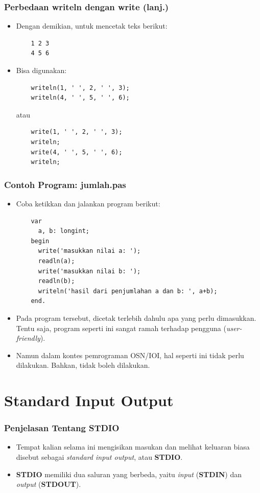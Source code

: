 \begin{frame}[fragile]
\frametitle{Perbedaan writeln dengan write (lanj.)}
\begin{itemize}
  \item Dengan demikian, untuk mencetak teks berikut:
  \begin{lstlisting}
    1 2 3
    4 5 6
  \end{lstlisting}
  \item Bisa digunakan:
  \begin{lstlisting}
    writeln(1, ' ', 2, ' ', 3);
    writeln(4, ' ', 5, ' ', 6);
  \end{lstlisting}
  atau
  \begin{lstlisting}
    write(1, ' ', 2, ' ', 3);
    writeln;
    write(4, ' ', 5, ' ', 6);
    writeln;
  \end{lstlisting}
\end{itemize}
\end{frame}

\begin{frame}[fragile]
\frametitle{Contoh Program: jumlah.pas}
\begin{itemize}
  \item Coba ketikkan dan jalankan program berikut:
  \begin{lstlisting}
    var
      a, b: longint;
    begin
      write('masukkan nilai a: ');
      readln(a);
      write('masukkan nilai b: ');
      readln(b);
      writeln('hasil dari penjumlahan a dan b: ', a+b);
    end.
  \end{lstlisting}
  \item Pada program tersebut, dicetak terlebih dahulu apa yang perlu dimasukkan. Tentu saja, program seperti ini sangat ramah terhadap pengguna (\textit{user-friendly}).
  \item Namun dalam kontes pemrograman OSN/IOI, hal seperti \newline ini tidak perlu dilakukan. Bahkan, tidak boleh dilakukan.
\end{itemize}
\end{frame}

\section{Standard Input Output}
\frame{\sectionpage}

\begin{frame}
\frametitle{Penjelasan Tentang STDIO}
\begin{itemize}
  \item Tempat kalian selama ini mengisikan masukan dan melihat keluaran biasa disebut sebagai \textit{standard input output}, atau \textbf{STDIO}.
  \item \textbf{STDIO} memiliki dua saluran yang berbeda, yaitu \textit{input} (\textbf{STDIN}) dan \textit{output} (\textbf{STDOUT}).
\end{itemize}
\end{frame}

